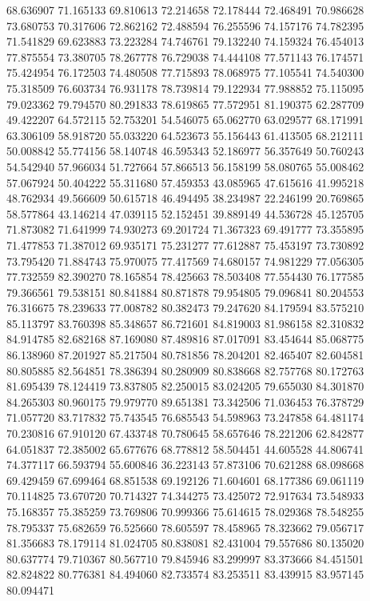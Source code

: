68.636907
71.165133
69.810613
72.214658
72.178444
72.468491
70.986628
73.680753
70.317606
72.862162
72.488594
76.255596
74.157176
74.782395
71.541829
69.623883
73.223284
74.746761
79.132240
74.159324
76.454013
77.875554
73.380705
78.267778
76.729038
74.444108
77.571143
76.174571
75.424954
76.172503
74.480508
77.715893
78.068975
77.105541
74.540300
75.318509
76.603734
76.931178
78.739814
79.122934
77.988852
75.115095
79.023362
79.794570
80.291833
78.619865
77.572951
81.190375
62.287709
49.422207
64.572115
52.753201
54.546075
65.062770
63.029577
68.171991
63.306109
58.918720
55.033220
64.523673
55.156443
61.413505
68.212111
50.008842
55.774156
58.140748
46.595343
52.186977
56.357649
50.760243
54.542940
57.966034
51.727664
57.866513
56.158199
58.080765
55.008462
57.067924
50.404222
55.311680
57.459353
43.085965
47.615616
41.995218
48.762934
49.566609
50.615718
46.494495
38.234987
22.246199
20.769865
58.577864
43.146214
47.039115
52.152451
39.889149
44.536728
45.125705
71.873082
71.641999
74.930273
69.201724
71.367323
69.491777
73.355895
71.477853
71.387012
69.935171
75.231277
77.612887
75.453197
73.730892
73.795420
71.884743
75.970075
77.417569
74.680157
74.981229
77.056305
77.732559
82.390270
78.165854
78.425663
78.503408
77.554430
76.177585
79.366561
79.538151
80.841884
80.871878
79.954805
79.096841
80.204553
76.316675
78.239633
77.008782
80.382473
79.247620
84.179594
83.575210
85.113797
83.760398
85.348657
86.721601
84.819003
81.986158
82.310832
84.914785
82.682168
87.169080
87.489816
87.017091
83.454644
85.068775
86.138960
87.201927
85.217504
80.781856
78.204201
82.465407
82.604581
80.805885
82.564851
78.386394
80.280909
80.838668
82.757768
80.172763
81.695439
78.124419
73.837805
82.250015
83.024205
79.655030
84.301870
84.265303
80.960175
79.979770
89.651381
73.342506
71.036453
76.378729
71.057720
83.717832
75.743545
76.685543
54.598963
73.247858
64.481174
70.230816
67.910120
67.433748
70.780645
58.657646
78.221206
62.842877
64.051837
72.385002
65.677676
68.778812
58.504451
44.605528
44.806741
74.377117
66.593794
55.600846
36.223143
57.873106
70.621288
68.098668
69.429459
67.699464
68.851538
69.192126
71.604601
68.177386
69.061119
70.114825
73.670720
70.714327
74.344275
73.425072
72.917634
73.548933
75.168357
75.385259
73.769806
70.999366
75.614615
78.029368
78.548255
78.795337
75.682659
76.525660
78.605597
78.458965
78.323662
79.056717
81.356683
78.179114
81.024705
80.838081
82.431004
79.557686
80.135020
80.637774
79.710367
80.567710
79.845946
83.299997
83.373666
84.451501
82.824822
80.776381
84.494060
82.733574
83.253511
83.439915
83.957145
80.094471
